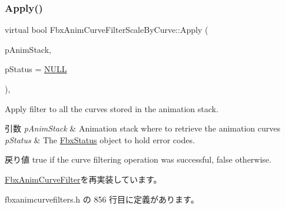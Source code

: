 \subsubsection{\texorpdfstring{Apply()}{Apply()}\hspace{0.1cm}{\footnotesize\ttfamily [1/5]}}
{\footnotesize\ttfamily virtual bool Fbx\+Anim\+Curve\+Filter\+Scale\+By\+Curve\+::\+Apply (\begin{DoxyParamCaption}\item[{\hyperlink{class_fbx_anim_stack}{Fbx\+Anim\+Stack} $\ast$}]{p\+Anim\+Stack,  }\item[{\hyperlink{class_fbx_status}{Fbx\+Status} $\ast$}]{p\+Status = {\ttfamily \hyperlink{fbxarch_8h_a070d2ce7b6bb7e5c05602aa8c308d0c4}{N\+U\+LL}} }\end{DoxyParamCaption})\hspace{0.3cm}{\ttfamily [inline]}, {\ttfamily [virtual]}}

Apply filter to all the curves stored in the animation stack. 
\begin{DoxyParams}{引数}
{\em p\+Anim\+Stack} & Animation stack where to retrieve the animation curves \\
\hline
{\em p\+Status} & The \hyperlink{class_fbx_status}{Fbx\+Status} object to hold error codes. \\
\hline
\end{DoxyParams}
\begin{DoxyReturn}{戻り値}
{\ttfamily true} if the curve filtering operation was successful, {\ttfamily false} otherwise. 
\end{DoxyReturn}


\hyperlink{class_fbx_anim_curve_filter_aef3900e6180e05661c27ee484ae939c3}{Fbx\+Anim\+Curve\+Filter}を再実装しています。



 fbxanimcurvefilters.\+h の 856 行目に定義があります。

\mbox{\label{class_fbx_anim_curve_filter_scale_by_curve_a7212a7c70bb1c0ae8f7c82c25de17745}} 

